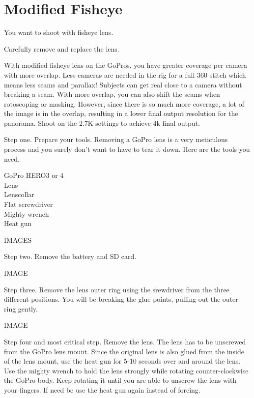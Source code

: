 \chapter{Modified Fisheye}
\pagecolor{white}
\label{chap:26}
\begin{fullwidth}

\problem

{\large You want to shoot with fisheye lens. \par}


\solution

{\large Carefully remove and replace the lens. \par}

With modified fisheye lens on the GoPros, you have greater coverage per camera with more overlap. Less cameras are needed in the rig for a full 360 stitch which means less seams and parallax! Subjects can get real close to a camera without breaking a seam. With more overlap, you can also shift the seams when rotoscoping or masking. However, since there is so much more coverage, a lot of the image is in the overlap, resulting in a lower final output resolution for the panorama. Shoot on the 2.7K settings to achieve 4k final output. 


Step one. Prepare your tools. Removing a GoPro lens is a very meticulous process and you surely don't want to have to tear it down. Here are the tools you need. 

GoPro HERO3 or 4
\\
Lens
\\
Lenscollar
\\
Flat screwdriver
\\
Mighty wrench
\\
Heat gun

IMAGES

Step two. Remove the battery and SD card.

IMAGE

Step three. Remove the lens outer ring using the srewdriver from the three different positions. You will be breaking the glue points, pulling out the outer ring gently.

IMAGE

Step four and most critical step. Remove the lens. The lens has to be unscrewed from the GoPro lens mount. Since the original lens is also glued from the inside of the lens mount, use the heat gun for 5-10 seconds over and around the lens. Use the mighty wrench to hold the lens strongly while rotating counter-clockwise the GoPro body. Keep rotating it until you are able to unscrew the lens with your fingers. If need be use the heat gun again instead of forcing.


\end{fullwidth}
